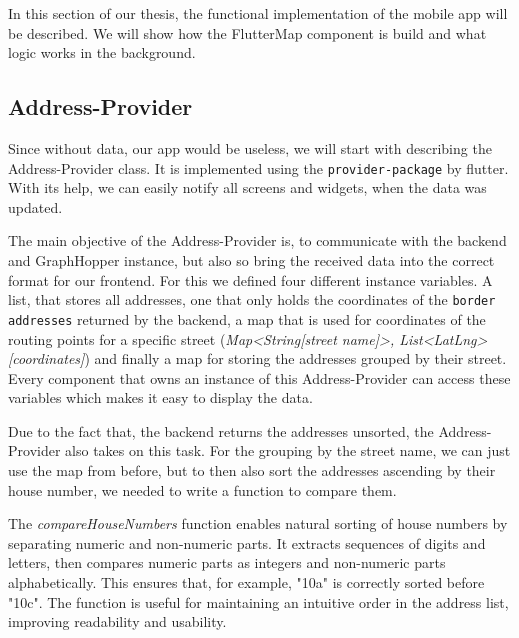\Author{\daAuthorTwo}

In this section of our thesis, the functional implementation of the mobile app will be described. We will show how the FlutterMap component is build and what logic works in the background.

\subsection{Address-Provider}

Since without data, our app would be useless, we will start with describing the Address-Provider class. It is implemented using the \texttt{provider-package} by flutter. With its help, we can easily notify all screens and widgets, when the data was updated.

\blankLine

The main objective of the Address-Provider is, to communicate with the backend and GraphHopper instance, but also so bring the received data into the correct format for our frontend. For this we defined four different instance variables. A list, that stores all addresses, one that only holds the coordinates of the \texttt{border addresses} returned by the backend, a map that is used for coordinates of the routing points for a specific street (\textit{Map<String[street name]>, List<LatLng>[coordinates]}) and finally a map for storing the addresses grouped by their street. Every component that owns an instance of this Address-Provider can access these variables which makes it easy to display the data.

\blankLine

Due to the fact that, the backend returns the addresses unsorted, the Address-Provider also takes on this task. For the grouping by the street name, we can just use the map from before, but to then also sort the addresses ascending by their house number, we needed to write a function to compare them.

\blankLine

The \textit{compareHouseNumbers} function enables natural sorting of house numbers by separating numeric and non-numeric parts. It extracts sequences of digits and letters, then compares numeric parts as integers and non-numeric parts alphabetically. This ensures that, for example, "10a" is correctly sorted before "10c". The function is useful for maintaining an intuitive order in the address list, improving readability and usability.

